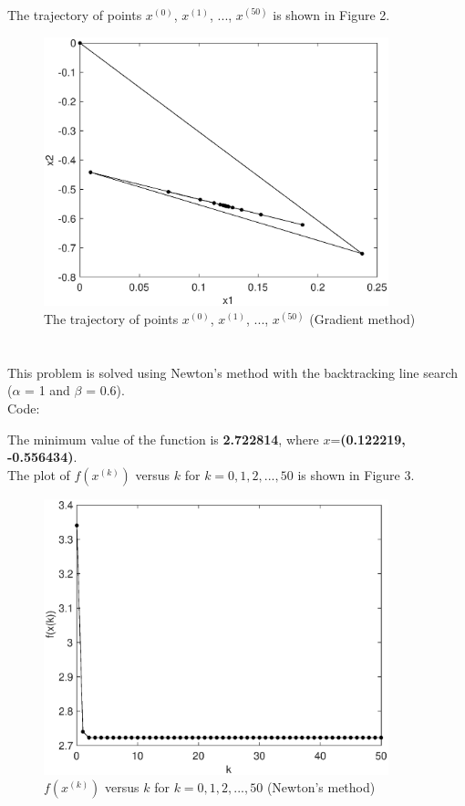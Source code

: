 \documentclass[12pt]{article}
\begin{document}
\noindent The trajectory of points $x^{(0)}$, $x^{(1)}$, ..., $x^{(50)}$ is shown in Figure 2.

\begin{figure}[!htbp]
	\centering
	\includegraphics[width=10cm]{figures/fig2.eps}      
	\caption{The trajectory of points $x^{(0)}$, $x^{(1)}$, ..., $x^{(50)}$ (Gradient method)}
\end{figure}

\section{}

This problem is solved using Newton's method with the backtracking line search ($\alpha$ = 1 and $\beta$ = 0.6).\\

\noindent Code:



\bigskip\noindent The minimum value of the function is \textbf{2.722814}, where $x$=\textbf{(0.122219, -0.556434)}.\\

\noindent The plot of $f(x^{(k)})$ versus $k$ for $k=0,1,2,...,50$ is shown in Figure 3.

\begin{figure}[!htbp]
	\centering
	\includegraphics[width=10cm]{figures/fig3.eps}      
	\caption{$f(x^{(k)})$ versus $k$ for $k=0,1,2,...,50$ (Newton's method)}
\end{figure}
\end{document}
